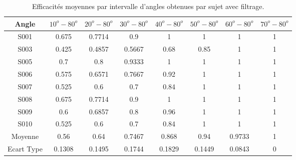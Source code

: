 \documentclass[letterpaper, twoside, 12pt, memoire, creativecommons, hyperref]{thETS}
\begin{document}
\begin{table}[ht]
	\caption{Efficacités moyennes par intervalle d'angles obtenues par sujet avec filtrage. }
		\begin{tabular}{|c|c|c|c|c|c|c|c|}
		\hline
			Angle & $10^{o}-80^{o}$ & $20^{o}-80^{o}$ & $30^{o}-80^{o}$ & $40^{o}-80^{o}$ & $50^{o}-80^{o}$ & $60^{o}-80^{o}$ & $70^{o}-80^{o}$ \\
	    \hline
	    		S001 & 0.675 & 0.7714 & 0.9 & 1 & 1 & 1 & 1\\
	    \hline
	    		S003  & 0.425 & 0.4857 & 0.5667 & 0.68 & 0.85 & 1 & 1\\
	    \hline
	    		S005  & 0.7 & 0.8 & 0.9333 & 1 & 1 & 1 & 1\\
	    \hline
	    		S006 & 0.575 & 0.6571 & 0.7667 & 0.92 & 1 & 1 & 1\\
	    \hline
	    		S007 & 0.525 & 0.6 & 0.7 & 0.84 & 1 & 1 & 1\\
	    \hline
	    		S008 & 0.675 & 0.7714 & 0.9 & 1 & 1 & 1 & 1\\
	    \hline
	    		S009 & 0.6 & 0.6857 & 0.8 & 0.96 & 1 & 1 & 1\\
	    \hline
	    		S010 & 0.525 & 0.6 & 0.7 & 0.84 & 1 & 1 & 1\\
	    \hline
	    		Moyenne  & 0.56 & 0.64 & 0.7467 & 0.868 & 0.94 & 0.9733 & 1\\
	    \hline
	    		Ecart Type & 0.1308 & 0.1495 & 0.1744 & 0.1829 & 0.1449 & 0.0843 & 0\\
	    \hline
		\end{tabular}
	\label{tab:effinterval}
\end{table}
\end{document}
